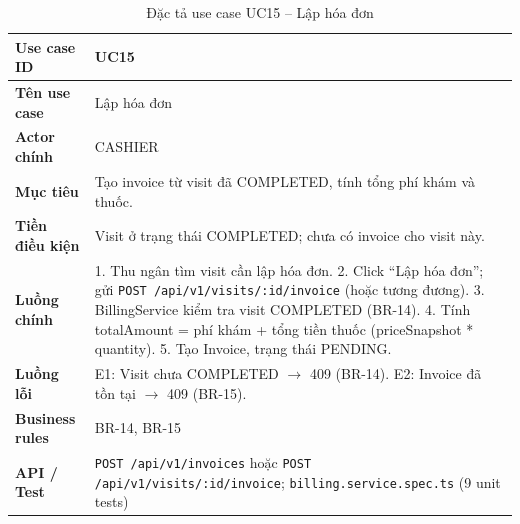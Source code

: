 \begin{table}[H]
\centering
\caption{Đặc tả use case UC15 -- Lập hóa đơn}
\label{tab:uc15}
\begin{tabularx}{\textwidth}{|p{3.6cm}|X|}
\hline
\textbf{Use case ID} & UC15 \\
\hline
\textbf{Tên use case} & Lập hóa đơn \\
\hline
\textbf{Actor chính} & CASHIER \\
\hline
\textbf{Mục tiêu} & Tạo invoice từ visit đã COMPLETED, tính tổng phí khám và thuốc. \\
\hline
\textbf{Tiền điều kiện} & Visit ở trạng thái COMPLETED; chưa có invoice cho visit này. \\
\hline
\textbf{Luồng chính} & 1. Thu ngân tìm visit cần lập hóa đơn. 2. Click ``Lập hóa đơn''; gửi \texttt{POST /api/v1/visits/:id/invoice} (hoặc tương đương). 3. BillingService kiểm tra visit COMPLETED (BR-14). 4. Tính totalAmount = phí khám + tổng tiền thuốc (priceSnapshot * quantity). 5. Tạo Invoice, trạng thái PENDING. \\
\hline
\textbf{Luồng lỗi} & E1: Visit chưa COMPLETED $\rightarrow$ 409 (BR-14). E2: Invoice đã tồn tại $\rightarrow$ 409 (BR-15). \\
\hline
\textbf{Business rules} & BR-14, BR-15 \\
\hline
\textbf{API / Test} & \texttt{POST /api/v1/invoices} hoặc \texttt{POST /api/v1/visits/:id/invoice}; \texttt{billing.service.spec.ts} (9 unit tests) \\
\hline
\end{tabularx}
\end{table}

